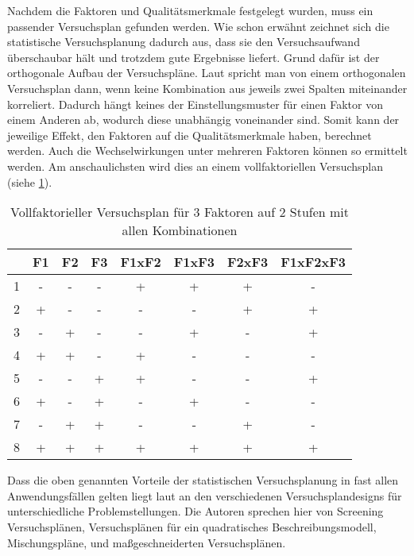 Nachdem die Faktoren und Qualitätsmerkmale festgelegt wurden, muss ein passender Versuchsplan gefunden werden. Wie schon erwähnt zeichnet sich die statistische Versuchsplanung dadurch aus, dass sie den Versuchsaufwand überschaubar hält und trotzdem gute Ergebnisse liefert. Grund dafür ist der orthogonale Aufbau der Versuchspläne. Laut \citet{Siebertz2016} spricht man von einem orthogonalen Versuchsplan dann, \glqq wenn keine Kombination aus jeweils zwei Spalten miteinander korreliert.\grqq
Dadurch hängt keines der Einstellungsmuster für einen Faktor von einem Anderen ab, wodurch diese unabhängig voneinander sind. Somit kann der jeweilige Effekt, den Faktoren auf die Qualitätsmerkmale haben, berechnet werden. Auch die Wechselwirkungen unter mehreren Faktoren können so ermittelt werden. Am anschaulichsten wird dies an einem vollfaktoriellen Versuchsplan (siehe \ref{tab:Vollfaktorplan}).

\begin{table}
	\centering
	\begin{tabular}{c|ccccccc}
		& F1 & F2 & F3 & F1xF2 & F1xF3 & F2xF3 & F1xF2xF3  \\ 
		\hline
		1 & -  & -  & -  & +     & +     & +     & -         \\
		2 & +  & -  & -  & -     & -     & +     & +         \\
		3 & -  & +  & -  & -     & +     & -     & +         \\
		4 & +  & +  & -  & +     & -     & -     & -         \\
		5 & -  & -  & +  & +     & -     & -     & +         \\
		6 & +  & -  & +  & -     & +     & -     & -         \\
		7 & -  & +  & +  & -     & -     & +     & -         \\
		8 & +  & +  & +  & +     & +     & +     & +        
	\end{tabular}
	\caption{Vollfaktorieller Versuchsplan für 3 Faktoren auf 2 Stufen mit allen Kombinationen}
	\label{tab:Vollfaktorplan}
\end{table}


Dass die oben genannten Vorteile der statistischen Versuchsplanung in fast allen Anwendungsfällen gelten liegt laut \citet{Siebertz2016} an den verschiedenen Versuchsplandesigns für unterschiedliche Problemstellungen. Die Autoren sprechen hier von Screening Versuchsplänen, Versuchsplänen für ein quadratisches Beschreibungsmodell, Mischungspläne, und maßgeschneiderten Versuchsplänen.


